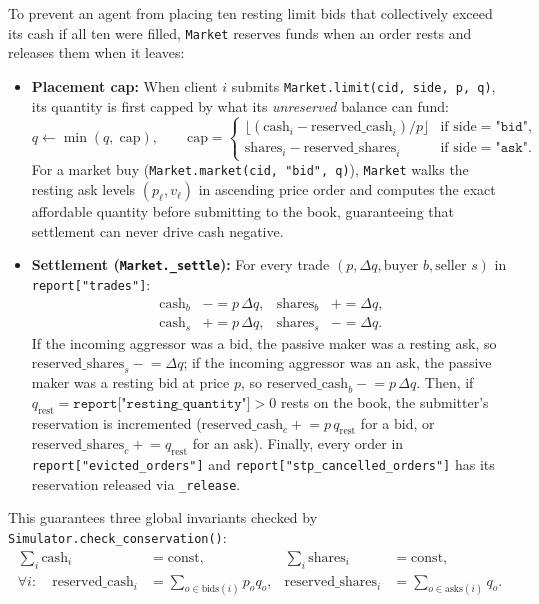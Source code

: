 \documentclass[11pt,a4paper]{article}
\newcommand{\code}[1]{\texttt{#1}}
\begin{document}
To prevent an agent from placing ten resting limit bids that collectively exceed its cash if all ten
were filled, \code{Market} reserves funds when an order rests and releases them when it leaves:
\begin{itemize}[nosep]
\item \textbf{Placement cap:} When client $i$ submits \code{Market.limit(cid, side, p, q)}, its
  quantity is first capped by what its \emph{unreserved} balance can fund:
  \begin{equation}
    q \leftarrow \min(q,\; \text{cap}), \qquad
    \text{cap} = \begin{cases}
      \lfloor (\text{cash}_i - \text{reserved\_cash}_i) / p \rfloor & \text{if } \text{side} = \code{"bid"}, \\
      \text{shares}_i - \text{reserved\_shares}_i & \text{if } \text{side} = \code{"ask"}.
    \end{cases}
  \end{equation}
  For a market buy (\code{Market.market(cid, "bid", q)}), \code{Market} walks the resting ask levels
  $(p_\ell, v_\ell)$ in ascending price order and computes the exact affordable quantity before
  submitting to the book, guaranteeing that settlement can never drive cash negative.
\item \textbf{Settlement (\code{Market.\_settle}):} For every trade $(p, \Delta q, \text{buyer } b,
  \text{seller } s)$ in \code{report["trades"]}:
  \begin{align}
    \text{cash}_b &\mathrel{-}= p\,\Delta q, & \text{shares}_b &\mathrel{+}= \Delta q, \\
    \text{cash}_s &\mathrel{+}= p\,\Delta q, & \text{shares}_s &\mathrel{-}= \Delta q.
  \end{align}
  If the incoming aggressor was a bid, the passive maker was a resting ask, so
  $\text{reserved\_shares}_s \mathrel{-}= \Delta q$; if the incoming aggressor was an ask, the passive
  maker was a resting bid at price $p$, so $\text{reserved\_cash}_b \mathrel{-}= p\,\Delta q$.
  Then, if $q_{\text{rest}} = \code{report["resting\_quantity"]} > 0$ rests on the book, the submitter's
  reservation is incremented ($\text{reserved\_cash}_c \mathrel{+}= p\,q_{\text{rest}}$ for a bid, or
  $\text{reserved\_shares}_c \mathrel{+}= q_{\text{rest}}$ for an ask). Finally, every order in
  \code{report["evicted\_orders"]} and \code{report["stp\_cancelled\_orders"]} has its reservation
  released via \code{\_release}.
\end{itemize}
This guarantees three global invariants checked by \code{Simulator.check\_conservation()}:
\begin{align}
  \sum_i \text{cash}_i &= \text{const}, &
  \sum_i \text{shares}_i &= \text{const}, \\
  \forall i:\quad \text{reserved\_cash}_i &= \!\!\sum_{o \in \text{bids}(i)}\!\! p_o q_o, &
  \text{reserved\_shares}_i &= \!\!\sum_{o \in \text{asks}(i)}\!\! q_o.
\end{align}
\end{document}
